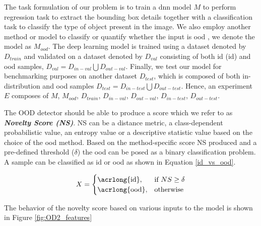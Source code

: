         The task formulation of our problem is to train a \acrshort{dnn} model $M$ to perform regression task to extract the bounding box details together with a classification task to classify the type of object present in the image. We also employ another method or model to classify or quantify whether the input is \acrshort{ood} , we denote the model as $M_{ood}$. The deep learning model is trained using a dataset denoted by $D_{train}$ and validated on a dataset denoted by $D_{val}$ consisting of both \acrlong{id} (\acrshort{id}) and \acrshort{ood} samples, $D_{val}=D_{in-val} \bigcup D_{out-val}$. Finally, we test our model for benchmarking purposes on another dataset $D_{test}$, which is composed of both in-distribution and \acrshort{ood} samples $D_{test}=D_{in-test} \bigcup D_{out-test}$. Hence, an experiment $E$ composes of {$M$, $M_{ood}$, $D_{train}$, $D_{in-val}$,  $D_{out-val}$, $D_{in-test}$, $D_{out-test}$}. 
        
        The OOD detector should be able to produce a score which we refer to as \textbf{\textit{Novelty Score (NS)}}. NS can be a distance metric, a class-dependent probabilistic value, an entropy value or a descriptive statistic value based on the choice of the \acrshort{ood} method. Based on the method-specific score NS produced and a pre-defined threshold ($\delta$) the \acrshort{ood} can be posed as a binary classification problem. A sample can be classified as \acrshort{id} or \acrshort{ood} as shown in Equation \ref{id_vs_ood}.
        
        \begin{equation}
            X=
            \begin{cases}
              \text{\acrlong{id}}, & \text{if}\ NS \geq \delta \\
              \text{\acrlong{ood}}, & \text{otherwise} 
            \end{cases}
            \label{id_vs_ood}
        \end{equation}
        
        The behavior of the novelty score based on various inputs to the model is shown in Figure \ref{fig:OD2_features}
        
